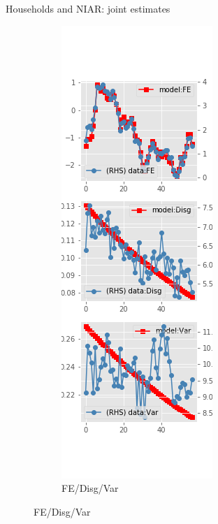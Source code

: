 \documentclass{beamer}
\begin{document}
\begin{frame}{Households and NIAR: joint estimates}
\begin{figure}[ht]
\begin{subfigure}[b]{0.2\textwidth}
		\end{subfigure}
		\hfill
		\begin{subfigure}[b]{0.2\textwidth}
			\caption{FE/Disg/Var}
			\includegraphics[width=\textwidth, height = 0.8\textheight]{figuresDraft/sce_ni_est_joint_diag3.png}
		\end{subfigure}
	\end{figure}
\end{frame}
\end{document}

